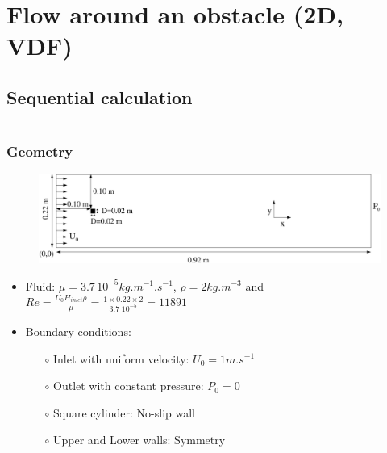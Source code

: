 \documentclass[10pt, hyperref={unicode=true,pdfusetitle, bookmarks=true,bookmarksnumbered=false,bookmarksopen=false, breaklinks=false,pdfborder={0 0 1},backref=true,colorlinks=true,linkcolor=darkblue,pageanchor}]{beamer}
\begin{document}
\section{{\bf{Flow around an obstacle (2D, VDF)}}} \label{exo1}
\subsection{Sequential calculation}
\begin{frame}
\begin{columns}[c] 
\tableofcontents[sections={1-9},currentsection, currentsubsection]
\tableofcontents[sections={10-16},currentsection, currentsubsection]
\end{columns}
\end{frame}
\begin{frame}
\frametitle{Geometry}
\begin{block}{}

\begin{figure}
\includegraphics[width=1\textwidth]{PICTURES/Obstacle.pdf}
\end{figure}

\begin{itemize}
\item Fluid: $\mu=3.7 \, 10^{-5} kg.m^{-1}.s^{-1}$, $\rho=2 kg.m^{-3}$ and $Re=\frac{U_0 H_{inlet} \rho}{\mu} = \frac{1 \times 0.22 \times 2}{3.7 \;10^{-5}} = 11 891$
\item Boundary conditions:\\
    \begin{itemize}
    \item [$\circ$] Inlet with uniform velocity: $U_0=1 m.s^{-1}$
    \item [$\circ$] Outlet with constant pressure: $P_0=0$
    \item [$\circ$] Square cylinder: No-slip wall
    \item [$\circ$] Upper and Lower walls: Symmetry
    \end{itemize}
\end{itemize}

\end{block}
\end{frame}
\end{document}
